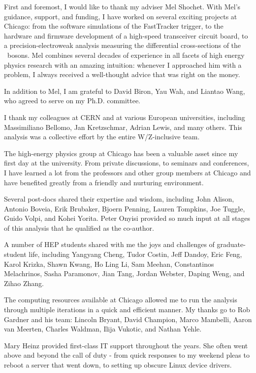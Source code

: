 
First and foremost, I would like to thank my adviser Mel Shochet. With Mel's guidance, support, and funding, I have worked on several exciting projects at Chicago: from the software simulations of the FastTracker trigger, to the hardware and firmware development of a high-speed transceiver circuit board, to a precision-electroweak analysis measuring the differential cross-sections of the \Wpm\ bosons. Mel combines several decades of experience in all facets of high energy physics research with an amazing intuition: whenever I approached him with a problem, I always received a well-thought advice that was right on the money.

In addition to Mel, I am grateful to David Biron, Yau Wah, and Liantao Wang, who agreed to serve on my Ph.D. committee.

I thank my colleagues at CERN and at various European universities, including Massimiliano Bellomo, Jan Kretzschmar, Adrian Lewis, and many others. This analysis was a collective effort by the entire W/Z-inclusive team.

The high-energy physics group at Chicago has been a valuable asset since my first day at the university. From private discussions, to seminars and conferences, I have learned a lot from the professors and other group members at Chicago and have benefited greatly from a friendly and nurturing environment.

Several post-docs shared their expertise and wisdom, including John Alison, Antonio Boveia, Erik Brubaker, Bjoern Penning, Lauren Tompkins, Joe Tuggle, Guido Volpi, and Kohei Yorita. Peter Onyisi provided so much input at all stages of this analysis that he qualified as the co-author.

A number of HEP students shared with me the joys and challenges of graduate-student life, including Yangyang Cheng, Tudor Costin, Jeff Dandoy, Eric Feng, Karol Krizka, Shawn Kwang, Ho Ling Li, Sam Meehan, Constantinos Melachrinos, Sasha Paramonov, Jian Tang, Jordan Webster, Daping Weng, and Zihao Zhang.

The computing resources available at Chicago allowed me to run the analysis through multiple iterations in a quick and efficient manner. My thanks go to Rob Gardner and his team: Lincoln Bryant, David Champion, Marco Mambelli, Aaron van Meerten, Charles Waldman, Ilija Vukotic, and Nathan Yehle.

Mary Heinz provided first-class IT support throughout the years. She often went above and beyond the call of duty - from quick responses to my weekend pleas to reboot a server that went down, to setting up obscure Linux device drivers.

